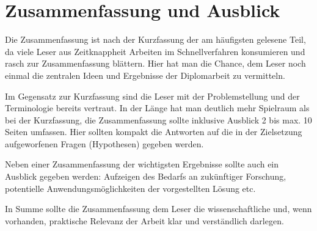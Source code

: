 \chapter{Zusammenfassung und Ausblick}
\label{sec:conclusion}

Die Zusammenfassung ist nach der Kurzfassung der am häufigsten gelesene Teil, da viele Leser aus Zeitknappheit Arbeiten im Schnellverfahren konsumieren und rasch zur Zusammenfassung blättern. Hier hat man die Chance, dem Leser noch einmal die zentralen Ideen und Ergebnisse der Diplomarbeit zu vermitteln.

Im Gegensatz zur Kurzfassung sind die Leser mit der Problemstellung und der Terminologie bereits vertraut. In der Länge hat man deutlich mehr Spielraum als bei der Kurzfassung, die Zusammenfassung sollte inklusive Ausblick 2 bis max. 10 Seiten umfassen. Hier sollten kompakt die Antworten auf die in der Zielsetzung aufgeworfenen Fragen (Hypothesen) gegeben werden.

Neben einer Zusammenfassung der wichtigsten Ergebnisse sollte auch ein Ausblick gegeben werden: Aufzeigen des Bedarfs an zukünftiger Forschung, potentielle Anwendungsmöglichkeiten der vorgestellten Lösung etc.

In Summe sollte die Zusammenfassung dem Leser die wissenschaftliche und, wenn vorhanden, praktische Relevanz der Arbeit klar und verständlich darlegen.